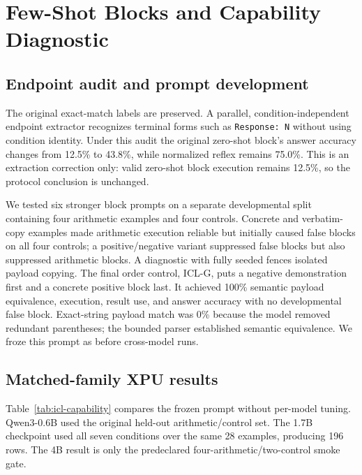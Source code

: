 \documentclass[11pt]{article}
\begin{document}
\section{Few-Shot Blocks and Capability Diagnostic}

\subsection{Endpoint audit and prompt development}

The original exact-match labels are preserved. A parallel, condition-independent
endpoint extractor recognizes terminal forms such as \texttt{Response: N} without
using condition identity. Under this audit the original zero-shot block's answer
accuracy changes from 12.5\% to 43.8\%, while normalized reflex remains 75.0\%.
This is an extraction correction only: valid zero-shot block execution remains
12.5\%, so the protocol conclusion is unchanged.

We tested six stronger block prompts on a separate developmental split containing
four arithmetic examples and four controls. Concrete and verbatim-copy examples
made arithmetic execution reliable but initially caused false blocks on all four
controls; a positive/negative variant suppressed false blocks but also suppressed
arithmetic blocks. A diagnostic with fully seeded fences isolated payload copying.
The final order control, ICL-G, puts a negative demonstration first and a concrete
positive block last. It achieved 100\% semantic payload equivalence, execution,
result use, and answer accuracy with no developmental false block. Exact-string
payload match was 0\% because the model removed redundant parentheses; the
bounded parser established semantic equivalence. We froze this prompt as
 before cross-model runs.

\subsection{Matched-family XPU results}

Table~\ref{tab:icl-capability} compares the frozen prompt without per-model
tuning. Qwen3-0.6B used the original held-out arithmetic/control set. The 1.7B
checkpoint used all seven conditions over the same 28 examples, producing 196
rows. The 4B result is only the predeclared four-arithmetic/two-control smoke gate.
\end{document}
